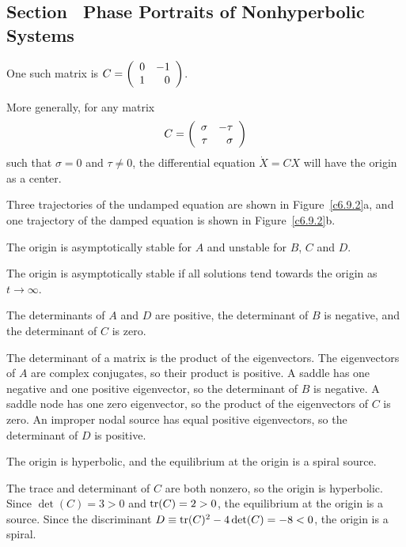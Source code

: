 \newpage
\subsection*{Section~\protect{\ref{S:6.9}} Phase Portraits of Nonhyperbolic
Systems}

 \ans One such matrix is $C = \left(\begin{array}{rr} 0 & -1\\ 1 &0\end{array}\right)$.

\soln More generally, for any matrix
\[
C = \left(\begin{array}{rr} \sigma & -\tau\\ \tau &\sigma\end{array}\right)
\]
such that $\sigma = 0$ and $\tau \neq 0$, the differential equation
$\dot{X} = CX$ will have the origin as a center.

Three trajectories of the undamped equation are shown in Figure~\ref{c6.9.2}a,
and one trajectory of the damped equation is shown in Figure~\ref{c6.9.2}b.

\begin{figure}[htb]
                       \centerline{%
                       }
\end{figure}

 \ans The origin is asymptotically stable for $A$ and unstable
for $B$, $C$ and $D$.

\soln The origin is asymptotically stable if all solutions tend towards
the origin as $t \rightarrow \infty$.

 \ans The determinants of $A$ and $D$ are positive, the
determinant of $B$ is negative, and the determinant of $C$ is zero.

\soln The determinant of a matrix is the product of the eigenvectors.  The
eigenvectors of $A$ are complex conjugates, so their product
is positive.  A saddle has one negative and one positive eigenvector, so
the determinant of $B$ is negative.  A saddle node has one zero
eigenvector, so the product of the eigenvectors of $C$ is zero.  An
improper nodal source has equal positive eigenvectors, so the determinant
of $D$ is positive.

\newpage
{} \ans The origin is hyperbolic, and the equilibrium at the origin
is a spiral source.

\soln The trace and determinant of $C$ are both nonzero, so the origin
is hyperbolic.  Since $\det(C) = 3 > 0$ and ${\rm tr}(C) = 2 > 0$,
the equilibrium at the origin is a source.  Since the discriminant
$D \equiv {\rm tr}(C)^2 - 4\det(C) = -8 < 0$, the origin is a spiral.

